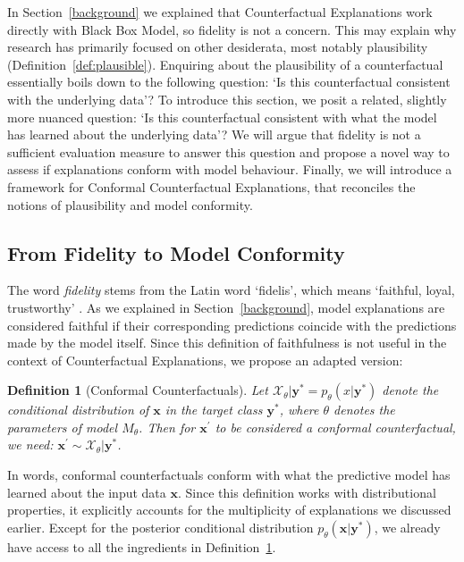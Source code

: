 \documentclass{article}
\newtheorem{definition}{Definition}[section]
\begin{document}
In Section~\ref{background} we explained that Counterfactual Explanations work directly with Black Box Model, so fidelity is not a concern. This may explain why research has primarily focused on other desiderata, most notably plausibility (Definition~\ref{def:plausible}). Enquiring about the plausibility of a counterfactual essentially boils down to the following question: `Is this counterfactual consistent with the underlying data'? To introduce this section, we posit a related, slightly more nuanced question: `Is this counterfactual consistent with what the model has learned about the underlying data'? We will argue that fidelity is not a sufficient evaluation measure to answer this question and propose a novel way to assess if explanations conform with model behaviour. Finally, we will introduce a framework for Conformal Counterfactual Explanations, that reconciles the notions of plausibility and model conformity. 

\subsection{From Fidelity to Model Conformity}

The word \textit{fidelity} stems from the Latin word `fidelis', which means `faithful, loyal, trustworthy' \citep{mw2023fidelity}. As we explained in Section~\ref{background}, model explanations are considered faithful if their corresponding predictions coincide with the predictions made by the model itself. Since this definition of faithfulness is not useful in the context of Counterfactual Explanations, we propose an adapted version: 

\begin{definition}[Conformal Counterfactuals]
  \label{def:conformal}
  Let $\mathcal{X}_{\theta}|\mathbf{y}^* = p_{\theta}(x|\mathbf{y}^*)$ denote the conditional distribution of $\mathbf{x}$ in the target class $\mathbf{y}^*$, where $\theta$ denotes the parameters of model $M_{\theta}$. Then for $\mathbf{x}^{\prime}$ to be considered a conformal counterfactual, we need: $\mathbf{x}^{\prime} \sim \mathcal{X}_{\theta}|\mathbf{y}^*$.
\end{definition}

In words, conformal counterfactuals conform with what the predictive model has learned about the input data $\mathbf{x}$. Since this definition works with distributional properties, it explicitly accounts for the multiplicity of explanations we discussed earlier. Except for the posterior conditional distribution $p_{\theta}(\mathbf{x}|\mathbf{y}^*)$, we already have access to all the ingredients in Definition~\ref{def:conformal}.
\end{document}
